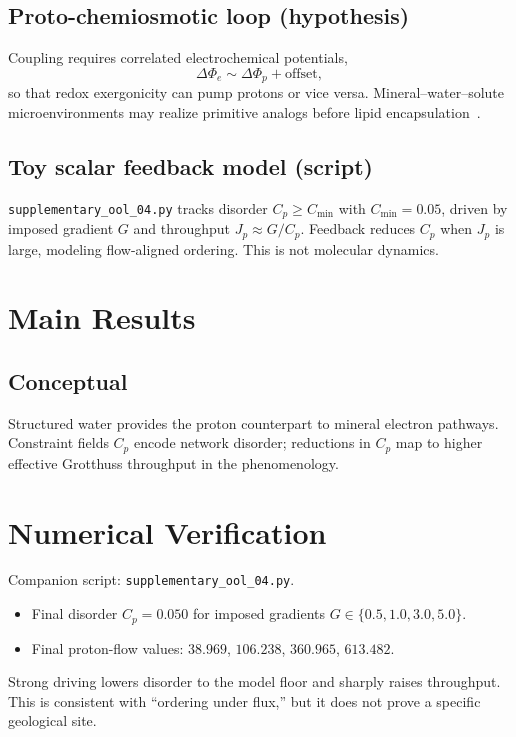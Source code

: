 \documentclass[11pt,a4paper]{article}
\begin{document}
\subsection{Proto-chemiosmotic loop (hypothesis)}
Coupling requires correlated electrochemical potentials,
\begin{equation}
\Delta\Phi_e \sim \Delta\Phi_p + \text{offset},
\end{equation}
so that redox exergonicity can pump protons or vice versa. Mineral--water--solute microenvironments may realize primitive analogs before lipid encapsulation~\cite{Branscomb2018}.

\subsection{Toy scalar feedback model (script)}
\texttt{supplementary\_ool\_04.py} tracks disorder $C_p\ge C_{\min}$ with $C_{\min}=0.05$, driven by imposed gradient $G$ and throughput $J_p\approx G/C_p$. Feedback reduces $C_p$ when $J_p$ is large, modeling flow-aligned ordering. This is not molecular dynamics.

\section{Main Results}

\subsection{Conceptual}
Structured water provides the proton counterpart to mineral electron pathways. Constraint fields $C_p$ encode network disorder; reductions in $C_p$ map to higher effective Grotthuss throughput in the phenomenology.

\section{Numerical Verification}
Companion script: \texttt{supplementary\_ool\_04.py}.
\begin{itemize}
\item Final disorder $C_p=0.050$ for imposed gradients $G\in\{0.5,1.0,3.0,5.0\}$.
\item Final proton-flow values: $38.969$, $106.238$, $360.965$, $613.482$.
\end{itemize}
Strong driving lowers disorder to the model floor and sharply raises
throughput. This is consistent with ``ordering under flux,'' but it does not
prove a specific geological site.
\end{document}
